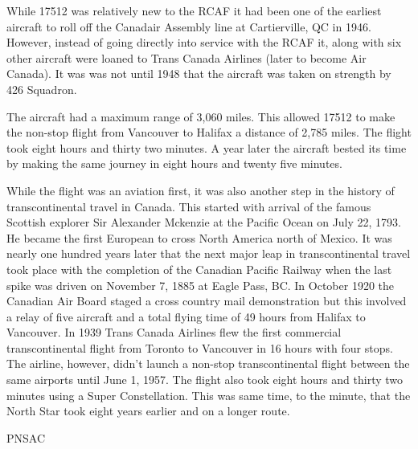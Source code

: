 While 17512 was relatively new to the RCAF it had been one of the earliest
aircraft to roll off the Canadair Assembly line at Cartierville, QC in 1946.
However, instead of going directly into service with the RCAF it, along with
six other aircraft were loaned to Trans Canada Airlines (later to become Air
Canada). It was was not until 1948 that the aircraft was taken on strength by
426 Squadron.

The aircraft had a maximum range of 3,060 miles. This allowed 17512 to make the
non-stop flight from Vancouver to Halifax a distance of 2,785 miles. The flight
took eight hours and thirty two minutes. A year later the aircraft bested its
time by making the same journey in eight hours and twenty five minutes.

While the flight was an aviation first, it was also another step in the history
of transcontinental travel in Canada. This started with arrival of the famous
Scottish explorer Sir Alexander Mckenzie at the Pacific Ocean on July 22, 1793.
He became the first European to cross North America north of Mexico. It was
nearly one hundred years later that the next major leap in transcontinental
travel took place with the completion of the Canadian Pacific Railway when the
last spike was driven on November 7, 1885 at Eagle Pass, BC. In October 1920
the Canadian Air Board staged a cross country mail demonstration but this
involved a relay of five aircraft and a total flying time of 49 hours from
Halifax to Vancouver. In 1939 Trans Canada Airlines flew the first commercial
transcontinental flight from Toronto to Vancouver in 16 hours with four stops.
The airline, however, didn't launch a non-stop transcontinental flight between
the same airports until June 1, 1957. The flight also took eight hours and
thirty two minutes using a Super Constellation. This was same time, to the
minute, that the North Star took eight years earlier and on a longer route.







\begin{footnotesize}
    \raggedleft PNSAC\\
\end{footnotesize}




